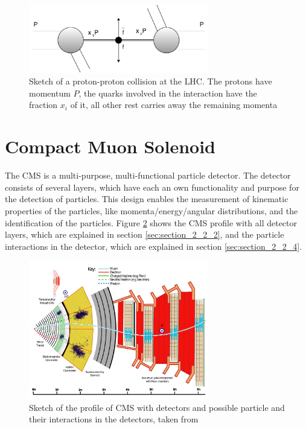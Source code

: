\begin{figure}[ht]
	\centering
	\includegraphics[width=0.7\textwidth]{pictures/ppcollision.pdf}

	\caption[Sketch of proton-proton collision]{Sketch of a proton-proton collision at the \gls{LHC}. The protons have momentum $P$, the quarks involved in the interaction have the fraction $x_{i}$ of it, all other rest carries away the remaining momenta}
	\label{fig:fig_2_4}
\end{figure}


\section{Compact Muon Solenoid}
\label{sec:section_2_2}

The \gls{CMS} is a multi-purpose, multi-functional particle detector. The detector consists of several layers, which have each an own functionality and purpose for the detection of particles. This design enables the measurement of kinematic properties of the particles, like momenta/energy/angular distributions, and the identification of the particles. Figure \ref{fig:fig_2_5} shows the \gls{CMS} profile with all detector layers, which are explained in section \ref{sec:section_2_2_2}, and the particle interactions in the detector, which are explained in section \ref{sec:section_2_2_4}.

\begin{figure}[ht]
	\centering
	\includegraphics[width=0.7\textwidth]{pictures/CMS.pdf}

	\caption[Profile of CMS detector]{Sketch of the profile of \gls{CMS} with detectors and possible particle and their interactions in the detectors, taken from \cite{PARTICLEFLOW}}
	\label{fig:fig_2_5}
\end{figure}


